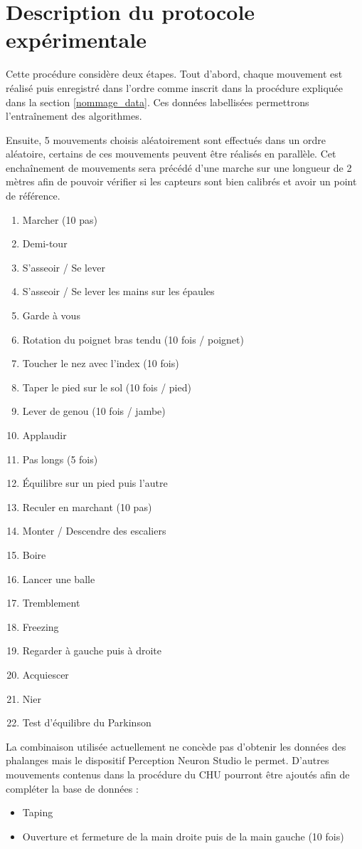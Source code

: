 \documentclass{article}
\begin{document}
\section{Description du protocole expérimentale}
\label{protocole}

Cette procédure considère deux étapes. Tout d'abord, chaque mouvement est réalisé puis enregistré dans l'ordre comme inscrit dans la procédure expliquée dans la section \ref{nommage_data}. Ces données labellisées permettrons l'entraînement des algorithmes.

Ensuite, 5 mouvements choisis aléatoirement sont effectués dans un ordre aléatoire, certains de ces mouvements peuvent être réalisés en parallèle. Cet enchaînement de mouvements sera précédé d'une marche sur une longueur de 2 mètres afin de pouvoir vérifier si les capteurs sont bien calibrés et avoir un point de référence.

\begin{enumerate}
	\item Marcher (10 pas)
	\item Demi-tour
	\item S'asseoir / Se lever
	\item S'asseoir / Se lever les mains sur les épaules
	\item Garde à vous
	\item Rotation du poignet bras tendu (10 fois / poignet)
	\item Toucher le nez avec l'index (10 fois)
	\item Taper le pied sur le sol (10 fois / pied)
	\item Lever de genou (10 fois / jambe)
	\item Applaudir
	\item Pas longs (5 fois)
	\item Équilibre sur un pied puis l'autre
	\item Reculer en marchant (10 pas)
	\item Monter / Descendre des escaliers
	\item Boire
	\item Lancer une balle
	\item Tremblement
	\item Freezing
	\item Regarder à gauche puis à droite
	\item Acquiescer
	\item Nier
	\item Test d'équilibre du Parkinson
\end{enumerate}

La combinaison utilisée actuellement ne concède pas  d'obtenir les données des phalanges mais le dispositif Perception Neuron Studio le permet. D'autres mouvements contenus dans la procédure du CHU pourront être ajoutés afin de compléter la base de données :

\begin{itemize}
	\item Taping 
	\item Ouverture et fermeture de la main droite puis de la main gauche (10 fois) 
\end{itemize}

\newpage
\printglossary
\printglossary[type=\acronymtype]
\end{document}
